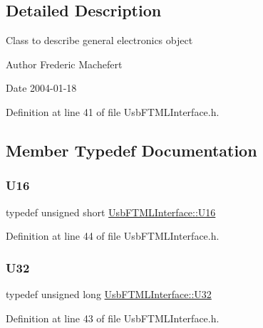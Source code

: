 \subsection{Detailed Description}
Class to describe general electronics object

\begin{DoxyAuthor}{Author}
Frederic Machefert 
\end{DoxyAuthor}
\begin{DoxyDate}{Date}
2004-\/01-\/18 
\end{DoxyDate}


Definition at line 41 of file Usb\+F\+T\+M\+L\+Interface.\+h.



\subsection{Member Typedef Documentation}
\mbox{\label{classUsbFTMLInterface_a5909beb462dc45c772d6f7ae79312ad7}} 
\subsubsection{\texorpdfstring{U16}{U16}}
{\footnotesize\ttfamily typedef unsigned short \hyperlink{classUsbFTMLInterface_a5909beb462dc45c772d6f7ae79312ad7}{Usb\+F\+T\+M\+L\+Interface\+::\+U16}}



Definition at line 44 of file Usb\+F\+T\+M\+L\+Interface.\+h.

\mbox{\label{classUsbFTMLInterface_a142f8ce4b5873c295af8945f3894ae38}} 
\subsubsection{\texorpdfstring{U32}{U32}}
{\footnotesize\ttfamily typedef unsigned long \hyperlink{classUsbFTMLInterface_a142f8ce4b5873c295af8945f3894ae38}{Usb\+F\+T\+M\+L\+Interface\+::\+U32}}



Definition at line 43 of file Usb\+F\+T\+M\+L\+Interface.\+h.

